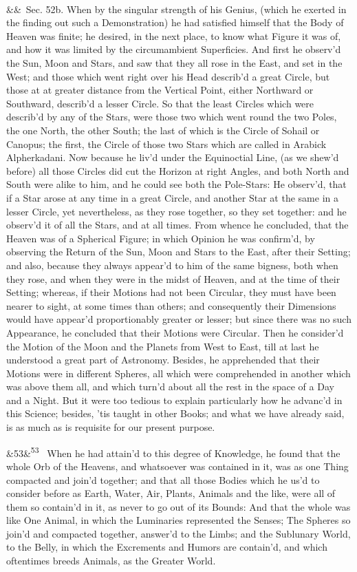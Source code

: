 \documentclass[12pt]{article}
\newcommand{\para}[1][]{\par\noindent\ifx&#1&\else\textsuperscript{\footnotesize #1}~\fi}
\begin{document}
\para Sec. 52b. When by the singular strength of his Genius, (which he exerted in the finding out such a Demonstration) he had satisfied himself that the Body of Heaven was finite; he desired, in the next place, to know what Figure it was of, and how it was limited by the circumambient Superficies. And first he observ'd the Sun, Moon and Stars, and saw that they all rose in the East, and set in the West; and those which went right over his Head describ'd a great Circle, but those at at greater distance from the Vertical Point, either Northward or Southward, describ'd a lesser Circle. So that the least Circles which were describ'd by any of the Stars, were those two which went round the two Poles, the one North, the other South; the last of which is the Circle of Sohail or Canopus; the first, the Circle of those two Stars which are called in Arabick Alpherkadani. Now because he liv'd under the Equinoctial Line, (as we shew'd before) all those Circles did cut the Horizon at right Angles, and both North and South were alike to him, and he could see both the Pole-Stars: He observ'd, that if a Star arose at any time in a great Circle, and another Star at the same in a lesser Circle, yet nevertheless, as they rose together, so they set together: and he observ'd it of all the Stars, and at all times. From whence he concluded, that the Heaven was of a Spherical Figure; in which Opinion he was confirm'd, by observing the Return of the Sun, Moon and Stars to the East, after their Setting; and also, because they always appear'd to him of the same bigness, both when they rose, and when they were in the midst of Heaven, and at the time of their Setting; whereas, if their Motions had not been Circular, they must have been nearer to sight, at some times than others; and consequently their Dimensions would have appear'd proportionably greater or lesser; but since there was no such Appearance, he concluded that their Motions were Circular. Then he consider'd the Motion of the Moon and the Planets from West to East, till at last he understood a great part of Astronomy. Besides, he apprehended that their Motions were in different Spheres, all which were comprehended in another which was above them all, and which turn'd about all the rest in the space of a Day and a Night. But it were too tedious to explain particularly how he advanc'd in this Science; besides, 'tis taught in other Books; and what we have already said, is as much as is requisite for our present purpose.

\para[53] When he had attain'd to this degree of Knowledge, he found that the whole Orb of the Heavens, and whatsoever was contained in it, was as one Thing compacted and join'd together; and that all those Bodies which he us'd to consider before as Earth, Water, Air, Plants, Animals and the like, were all of them so contain'd in it, as never to go out of its Bounds: And that the whole was like One Animal, in which the Luminaries represented the Senses; The Spheres so join'd and compacted together, answer'd to the Limbs; and the Sublunary World, to the Belly, in which the Excrements and Humors are contain'd, and which oftentimes breeds Animals, as the Greater World.
\end{document}
